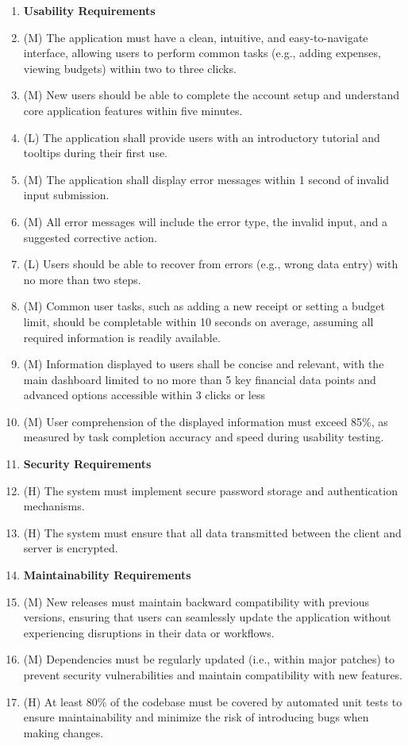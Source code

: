 \documentclass[12pt]{article}
\begin{document}
\begin{enumerate}[label=NFR\arabic*]
  \item[]\textbf{Usability Requirements}
  \item (M) The application must have a clean, intuitive, and easy-to-navigate
  interface, allowing users to perform common tasks (e.g., adding expenses,
  viewing budgets) within two to three clicks.
  \item (M) New users should be able to complete the account setup and understand
  core application features within five minutes.
  \item (L) The application shall provide users with an introductory tutorial and
  tooltips during their first use.
  \item (M) The application shall display error messages within 1 second of invalid 
  input submission.
  \item (M) All error messages will include the error type, the invalid 
  input, and a suggested corrective action.
  \item (L) Users should be able to recover from errors (e.g., wrong data entry)
  with no more than two steps.
  \item (M) Common user tasks, such as adding a new receipt or setting a budget
  limit, should be completable within 10 seconds on average, assuming all
  required information is readily available.
  \item (M) Information displayed to users shall be concise and relevant, with 
  the main dashboard limited to no more than 5 key financial data points and advanced 
  options accessible within 3 clicks or less
  \item (M) User comprehension of the displayed information must exceed 85\%, as measured 
  by task completion accuracy and speed during usability testing.

  \item[] \textbf{Security Requirements}
  \item (H) The system must implement secure password storage and authentication
  mechanisms.
  \item (H) The system must ensure that all data transmitted between the client and
  server is encrypted.
  

  \item[] \textbf{Maintainability Requirements}
  \item (M) New releases must maintain backward compatibility with previous
  versions, ensuring that users can seamlessly update the application without
  experiencing disruptions in their data or workflows.
  \item (M) Dependencies must be regularly updated (i.e., within major patches)
  to prevent security vulnerabilities and maintain compatibility with new
  features.
  \item (H) At least 80\% of the codebase must be covered by automated unit
  tests to ensure maintainability and minimize the risk of introducing bugs when
  making
  changes.


\end{enumerate}
\end{document}
